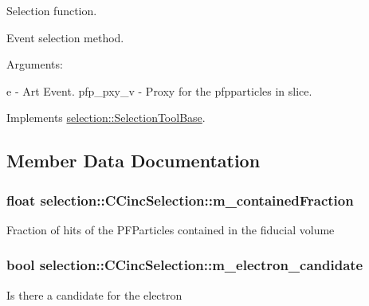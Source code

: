 Selection function. 

Event selection method.

Arguments\+:

e -\/ Art Event. pfp\+\_\+pxy\+\_\+v -\/ Proxy for the pfpparticles in slice. 

Implements \hyperlink{classselection_1_1SelectionToolBase_ab63818dac49b43418fe9eb3b8cd98c9c}{selection\+::\+Selection\+Tool\+Base}.



\subsection{Member Data Documentation}
\subsubsection[{\texorpdfstring{m\+\_\+contained\+Fraction}{m_containedFraction}}]{\setlength{\rightskip}{0pt plus 5cm}float selection\+::\+C\+Cinc\+Selection\+::m\+\_\+contained\+Fraction\hspace{0.3cm}{\ttfamily [private]}}\hypertarget{classselection_1_1CCincSelection_a5ac3c52c6a88691182c3b3c6594d9744}{}\label{classselection_1_1CCincSelection_a5ac3c52c6a88691182c3b3c6594d9744}
Fraction of hits of the P\+F\+Particles contained in the fiducial volume 
\subsubsection[{\texorpdfstring{m\+\_\+electron\+\_\+candidate}{m_electron_candidate}}]{\setlength{\rightskip}{0pt plus 5cm}bool selection\+::\+C\+Cinc\+Selection\+::m\+\_\+electron\+\_\+candidate\hspace{0.3cm}{\ttfamily [private]}}\hypertarget{classselection_1_1CCincSelection_a61b7a5e571eac85c8171a3dbd6ab57c6}{}\label{classselection_1_1CCincSelection_a61b7a5e571eac85c8171a3dbd6ab57c6}
Is there a candidate for the electron 
